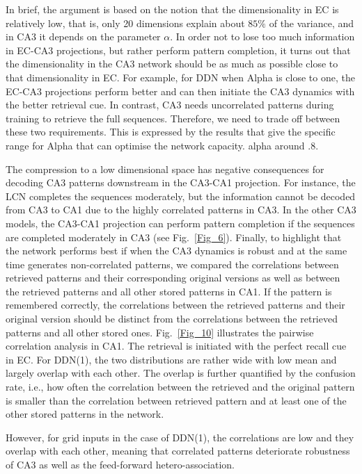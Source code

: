 \documentclass[utf8]{frontiersSCNS} %
\begin{document}
In brief, the argument is based on the notion that the dimensionality in EC is relatively low, that is, only 20 dimensions explain about $85 \%$ of the variance, and in CA3 it depends on the parameter $\alpha$. In order not to lose too much information in EC-CA3 projections, but rather perform pattern completion, it turns out that the dimensionality in the CA3 network should be as much as possible close to that dimensionality in EC. For example, for DDN when Alpha is close to one, the EC-CA3 projections perform better and can then initiate the CA3 dynamics with the better retrieval cue. In contrast, CA3 needs uncorrelated patterns during training to retrieve the full sequences.  Therefore, we need to trade off between these two requirements. This is expressed by the results that give the specific range for Alpha that can optimise the network capacity. alpha around .8. 
%

The compression to a low dimensional space has negative consequences for decoding CA3 patterns downstream in the CA3-CA1 projection. For instance, the LCN completes the sequences moderately, but the information cannot be decoded from CA3 to CA1 due to the highly correlated patterns in CA3. In the other CA3 models, the CA3-CA1 projection can perform pattern completion if the sequences are completed moderately in CA3 (see Fig.~\ref{Fig_6}). Finally, to highlight that the network performs best if when the CA3 dynamics is robust and at the same time generates non-correlated patterns, we compared the correlations between retrieved patterns and their corresponding original versions as well as between the retrieved patterns and all other stored patterns in CA1. If the pattern is remembered correctly, the correlations between the retrieved patterns and their original version should be distinct from the correlations between the retrieved patterns and all other stored ones. Fig.~\ref{Fig_10} illustrates the pairwise correlation analysis in CA1. The retrieval is initiated with the perfect recall cue in EC. For DDN(1), the two distributions are rather wide with low mean and largely overlap with each other. The overlap is further quantified by the confusion rate, i.e., how often the correlation between the retrieved and the original pattern is smaller than the correlation between retrieved pattern and at least one of the other stored patterns in the network.

However, for grid inputs in the case of DDN(1), the correlations are low and they overlap with each other, meaning that correlated patterns deteriorate robustness of CA3 as well as the feed-forward hetero-association.
\end{document}
